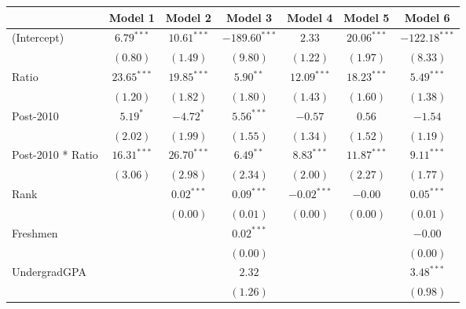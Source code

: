 \clearpage
\begin{table}
\begin{center}
\begin{tabular}{l c c c c c c }
\hline
                      & Model 1 & Model 2 & Model 3 & Model 4 & Model 5 & Model 6 \\
\hline
(Intercept)           & $6.79^{***}$  & $10.61^{***}$ & $-189.60^{***}$ & $2.33$        & $20.06^{***}$ & $-122.18^{***}$ \\
                      & $(0.80)$      & $(1.49)$      & $(9.80)$        & $(1.22)$      & $(1.97)$      & $(8.33)$        \\
Ratio                 & $23.65^{***}$ & $19.85^{***}$ & $5.90^{**}$     & $12.09^{***}$ & $18.23^{***}$ & $5.49^{***}$    \\
                      & $(1.20)$      & $(1.82)$      & $(1.80)$        & $(1.43)$      & $(1.60)$      & $(1.38)$        \\
Post-2010             & $5.19^{*}$    & $-4.72^{*}$   & $5.56^{***}$    & $-0.57$       & $0.56$        & $-1.54$         \\
                      & $(2.02)$      & $(1.99)$      & $(1.55)$        & $(1.34)$      & $(1.52)$      & $(1.19)$        \\
Post-2010 * Ratio     & $16.31^{***}$ & $26.70^{***}$ & $6.49^{**}$     & $8.83^{***}$  & $11.87^{***}$ & $9.11^{***}$    \\
                      & $(3.06)$      & $(2.98)$      & $(2.34)$        & $(2.00)$      & $(2.27)$      & $(1.77)$        \\
Rank                  &               & $0.02^{***}$  & $0.09^{***}$    & $-0.02^{***}$ & $-0.00$       & $0.05^{***}$    \\
                      &               & $(0.00)$      & $(0.01)$        & $(0.00)$      & $(0.00)$      & $(0.01)$        \\
Freshmen              &               &               & $0.02^{***}$    &               &               & $-0.00$         \\
                      &               &               & $(0.00)$        &               &               & $(0.00)$        \\
UndergradGPA          &               &               & $2.32$          &               &               & $3.48^{***}$    \\
                      &               &               & $(1.26)$        &               &               & $(0.98)$        \\

\end{tabular}
\end{center}
\end{table}
